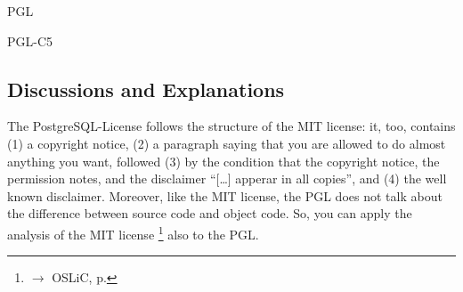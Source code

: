 \begin{license}{PGL}
\begin{lsuc}{PGL-C5}

  \begin{lsucrequires}
    \lsucmandatory{\giveLicense}
    \lsucoptional{\markModifications}
    \lsucoptional{\addToCopyrightDialog} 
    \lsucoptional{\linkToHomepage}
    \lsucoptional{\separateComponents}
  \end{lsucrequires}

  \lsucprohibitsnothing
\end{lsuc}


\subsection{Discussions and Explanations}

The PostgreSQL-License follows the structure of the MIT license: it, too, contains 
(1) a copyright notice, 
(2) a paragraph saying that you are allowed to do almost anything you want,
    followed 
(3) by the condition that the copyright notice, the permission notes, and the
    disclaimer \enquote{[\ldots] apperar in all copies}, and 
(4) the well known disclaimer.\citePGL{}
Moreover, like the MIT license, the PGL does not talk about the difference
between source code and object code. So, you can apply the analysis of the MIT
license%
  \footnote{$\rightarrow$ OSLiC, p. \pageref{MITDiscussion}} 
also to the PGL.

\end{license}
%

